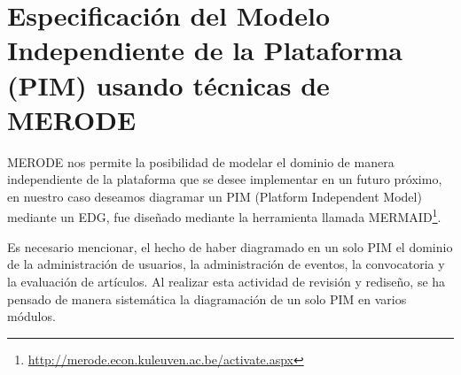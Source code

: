 \section{Especificaci\'on del Modelo Independiente de la Plataforma (PIM) usando t\'ecnicas de MERODE}
\begin{indentar}
MERODE nos permite la posibilidad de modelar el dominio de manera independiente de la plataforma que se desee implementar en un futuro pr\'oximo, en nuestro caso deseamos diagramar un PIM (Platform Independent Model) mediante un EDG, fue dise\~nado mediante la herramienta llamada MERMAID\footnote{\url{http://merode.econ.kuleuven.ac.be/activate.aspx}}.

Es necesario mencionar, el hecho de haber diagramado en un solo PIM el dominio de la administraci\'on de usuarios, la administraci\'on de eventos, la convocatoria y la evaluaci\'on de art\'iculos. Al realizar esta actividad de revisi\'on y redise\~no, se ha pensado de manera sistem\'atica la diagramaci\'on de un solo PIM en varios m\'odulos.
\end{indentar}

